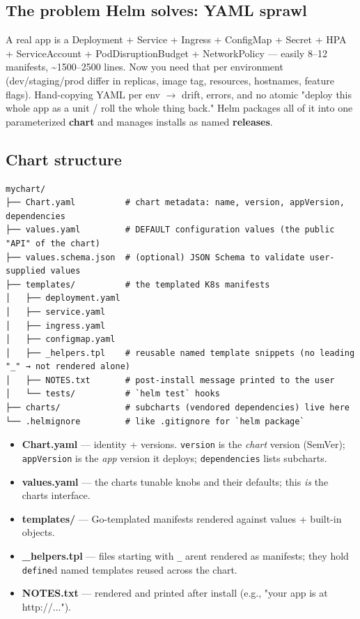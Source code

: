 \documentclass[11pt]{article}
\providecommand{\tightlist}{\setlength{\itemsep}{1pt}\setlength{\parskip}{0pt}}
\begin{document}
\subsection{The problem Helm solves: YAML sprawl}\label{the-problem-helm-solves-yaml-sprawl}

A real app is a Deployment + Service + Ingress + ConfigMap + Secret + HPA + ServiceAccount + PodDisruptionBudget + NetworkPolicy --- easily 8--12 manifests, \textasciitilde1500--2500 lines. Now you need that per environment (dev/staging/prod differ in replicas, image tag, resources, hostnames, feature flags). Hand-copying YAML per env \(\rightarrow\) drift, errors, and no atomic "deploy this whole app as a unit / roll the whole thing back." Helm packages all of it into one parameterized \textbf{chart} and manages installs as named \textbf{releases}.

\subsection{Chart structure}\label{chart-structure}

\setcodelang{}

\begin{verbatim}
mychart/
├── Chart.yaml          # chart metadata: name, version, appVersion, dependencies
├── values.yaml         # DEFAULT configuration values (the public "API" of the chart)
├── values.schema.json  # (optional) JSON Schema to validate user-supplied values
├── templates/          # the templated K8s manifests
│   ├── deployment.yaml
│   ├── service.yaml
│   ├── ingress.yaml
│   ├── configmap.yaml
│   ├── _helpers.tpl    # reusable named template snippets (no leading "_" → not rendered alone)
│   ├── NOTES.txt       # post-install message printed to the user
│   └── tests/          # `helm test` hooks
├── charts/             # subcharts (vendored dependencies) live here
└── .helmignore         # like .gitignore for `helm package`
\end{verbatim}

\begin{itemize}
\tightlist
\item
  \textbf{Chart.yaml} --- identity + versions. \texttt{version} is the \emph{chart} version (SemVer); \texttt{appVersion} is the \emph{app} version it deploys; \texttt{dependencies} lists subcharts.
\item
  \textbf{values.yaml} --- the chart\textquotesingle s tunable knobs and their defaults; this \emph{is} the chart\textquotesingle s interface.
\item
  \textbf{templates/} --- Go-templated manifests rendered against values + built-in objects.
\item
  \textbf{\_helpers.tpl} --- files starting with \texttt{\_} aren\textquotesingle t rendered as manifests; they hold \texttt{define}d named templates reused across the chart.
\item
  \textbf{NOTES.txt} --- rendered and printed after install (e.g., "your app is at http://...").
\end{itemize}
\end{document}
